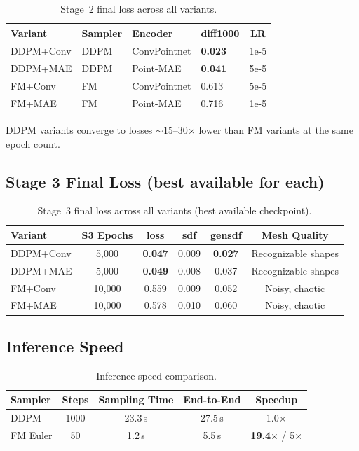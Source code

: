 \documentclass[11pt,letterpaper]{article}
\begin{document}
\begin{table}[H]
\centering
\caption{Stage~2 final loss across all variants.}
\label{tab:s2-consolidated}
\begin{tabular}{llllc}
\toprule
Variant & Sampler & Encoder & diff1000 & LR \\
\midrule
DDPM+Conv & DDPM & ConvPointnet & \textbf{0.023} & 1e-5 \\
DDPM+MAE  & DDPM & Point-MAE    & \textbf{0.041} & 5e-5 \\
FM+Conv   & FM   & ConvPointnet & 0.613          & 5e-5 \\
FM+MAE    & FM   & Point-MAE    & 0.716          & 1e-5 \\
\bottomrule
\end{tabular}
\end{table}

DDPM variants converge to losses ${\sim}$15--30$\times$ lower than FM variants at the same epoch count.

\subsection{Stage 3 Final Loss (best available for each)}

\begin{table}[H]
\centering
\caption{Stage~3 final loss across all variants (best available checkpoint).}
\label{tab:s3-consolidated}
\begin{tabular}{lccccc}
\toprule
Variant & S3 Epochs & loss & sdf & gensdf & Mesh Quality \\
\midrule
DDPM+Conv & 5{,}000  & \textbf{0.047} & 0.009 & \textbf{0.027} & Recognizable shapes \\
DDPM+MAE  & 5{,}000  & \textbf{0.049} & 0.008 & 0.037          & Recognizable shapes \\
FM+Conv   & 10{,}000 & 0.559          & 0.009 & 0.052          & Noisy, chaotic \\
FM+MAE    & 10{,}000 & 0.578          & 0.010 & 0.060          & Noisy, chaotic \\
\bottomrule
\end{tabular}
\end{table}

\subsection{Inference Speed}

\begin{table}[H]
\centering
\caption{Inference speed comparison.}
\label{tab:speed}
\begin{tabular}{lcccc}
\toprule
Sampler & Steps & Sampling Time & End-to-End & Speedup \\
\midrule
DDPM     & 1000 & 23.3\,s & 27.5\,s & 1.0$\times$ \\
FM Euler & 50   & 1.2\,s  & 5.5\,s  & \textbf{19.4$\times$} / 5$\times$ \\
\bottomrule
\end{tabular}
\end{table}
\end{document}
